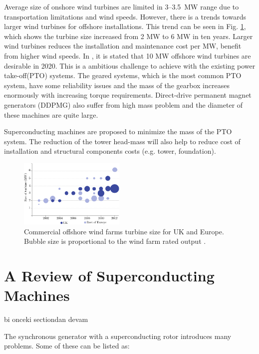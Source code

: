 \documentclass[12pt]{IET02}
\begin{document}
Average size of onshore wind turbines are limited in 3--3.5~MW range due to transportation limitations and wind speeds. However, there is a trends towards larger wind turbines for offshore installations. This trend can be seen in Fig. \ref{offshore-turbine-size}, which shows the turbine size increased from 2 MW to 6 MW in ten years. Larger wind turbines reduces the installation and maintenance cost per MW, benefit from higher wind speeds. In \cite{Abrahamsen2010}, it is stated that 10 MW offshore wind turbines are desirable in 2020. This is a ambitious challenge to achieve with the existing power take-off(PTO) systems. The geared systems, which is the most common PTO system, have some reliability issues and the mass of the gearbox increases enormously with increasing torque requirements. Direct-drive permanent magnet generators (DDPMG) also suffer from high mass problem and the diameter of these machines are quite large. 

Superconducting machines are proposed to minimize the mass of the PTO system. The reduction of the tower head-mass will also help to reduce cost of installation and structural components costs (e.g. tower, foundation).

\begin{figure}[]
  \centering
  \includegraphics[width=0.45\textwidth]{offshore-turbine-size}
\caption{Commercial offshore wind farms turbine size for UK and Europe. Bubble size is proportional to the wind farm rated output \cite{bvg}.}
  \label{offshore-turbine-size}
\end{figure}





\section{A Review of Superconducting Machines}

bi onceki sectiondan devam

The synchronous generator with a superconducting rotor introduces many problems. Some of these can be listed as:
\end{document}
